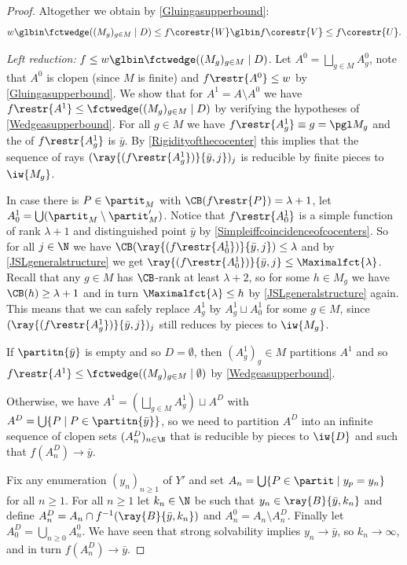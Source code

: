 \begin{proof}
Altogether we obtain by \cref{Gluingasupperbound}:
\[
w \glbin \fctwedge((M_g)_{ g\in M}\mid D) \leq f\corestr{W}\glbin f\corestr{V} \leq f\corestr{U}.
\]

\smallskip
\textit{Left reduction:} $f\leq w \glbin \fctwedge((M_g)_{ g\in M}\mid D)$.
Let $A^0=\bigsqcup_{g\in M} A^0_g$, note that $A^0$ is clopen (since $M$ is finite) and $f\restr{A^0}\leq w$ by \cref{Gluingasupperbound}.
We show that for $A^1=A\setminus A^0$ we have $f\restr{A^1}\leq \fctwedge((M_g)_{ g\in M}\mid D)$ by verifying the hypotheses of \cref{Wedgeasupperbound}.
For all $g\in M$ we have $f\restr{A^1_g}\equiv g=\pgl M_g$ and the \cocenter{} of $f\restr{A^1_g}$ is $\bar{y}$.
By \cref{Rigidityofthecocenter} this implies that the sequence of rays $(\ray{(f\restr{A^1_g})}{\bar{y},j})_j$ is reducible by finite pieces to $\iw{M_g}$.

In case there is $P\in \partit_M$ with $\CB(f\restr{P})= \lambda+1$, let $A^1_0=\bigcup  (\partit_M\setminus \partit'_M)$.
Notice that $f\restr{A^1_0}$ is a simple function of rank $\lambda+1$ and distinguished point $\bar{y}$ by \cref{Simpleiffcoincidenceofcocenters}. So for all $j\in\N$ we have $\CB(\ray{(f\restr{A^1_0})}{\bar{y},j})\leq\lambda$ and by \cref{JSLgeneralstructure} we get $\ray{(f\restr{A^1_0})}{\bar{y},j}\leq \Maximalfct{\lambda}$.
Recall that any $g\in M$ has $\CB$-rank at least $\lambda+2$, so for some $h\in M_g$ we have $\CB(h)\geq\lambda+1$
and in turn $\Maximalfct{\lambda}\leq h$ by \cref{JSLgeneralstructure} again.
This means that we can safely replace $A^1_g$ by $A^1_g \sqcup A^1_0$ for some $g\in M$, since $(\ray{(f\restr{A^1_g})}{\bar{y},j})_j$ still reduces by pieces to $\iw{M_g}$.

If $\partitn{\bar{y}}$ is empty and so $D=\emptyset$, then $(A^1_g)_g\in M$ partitions $A^1$ and so $f\restr{A^1}\leq \fctwedge((M_g)_{ g\in M}\mid \emptyset)$ by \cref{Wedgeasupperbound}.
\smallskip

Otherwise, we have $A^1=(\bigsqcup_{g\in M} A^1_g)\sqcup A^D$ with $A^D=\bigcup \{P\mid P\in \partitn{\bar{y}}\}$, so we need to partition $A^D$ into an infinite sequence of clopen sets $(A^D_n)_{n\in\N}$
that is reducible by pieces to $\iw{D}$ and such that $f(A^D_n) \to \bar{y}$.

Fix any enumeration $(y_n)_{n\geq 1}$ of $Y'$ and set $A_n=\bigcup \{ P\in \partit \mid y_p=y_n\}$ for all $n\geq 1$.
For all $n\geq 1$ let $k_n\in\N$ be such that $y_n\in \ray{B}{\bar{y},k_n}$ and define $A^D_n=A_n\cap f^{-1}( \ray{B}{\bar{y},k_n})$ and $A^0_n=A_n\setminus A^D_n$. Finally let $A^D_0=\bigcup_{n\geq 0} A^0_n$. %
We have seen that strong solvability implies $y_n\to \bar{y}$, so $k_{n}\to\infty$, and in turn $f(A^D_n)\to \bar{y}$.


\end{proof}
